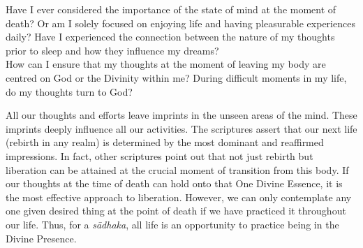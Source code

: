 \newpage
\begin{mananam}{}
\normalfont\mananamtext Have I ever considered the importance of the state of mind at the moment of death? Or am I solely focused on enjoying life and having pleasurable experiences daily? Have I experienced the connection between the nature of my thoughts prior to sleep and how they influence my dreams?\\
How can I ensure that my thoughts at the moment of leaving my body are centred on God or the Divinity within me? During difficult moments in my life, do my thoughts turn to God?
\end{mananam}
\sreflect
\begin{inspiration}{}
\normalfont\mananamtext All our thoughts and efforts leave imprints in the unseen areas of the mind. These imprints deeply influence all our activities. The scriptures assert that our next life (rebirth in any realm) is determined by the most dominant and reaffirmed impressions. In fact, other scriptures point out that not just rebirth but liberation can be attained at the crucial moment of transition from this body. If our thoughts at the time of death can hold onto that One Divine Essence, it is the most effective approach to liberation. However, we can only contemplate any one given desired thing at the point of death if we have practiced it throughout our life. Thus, for a \emph{sādhaka}, all life is an opportunity to practice being in the Divine Presence.
\end{inspiration}
\newpage



